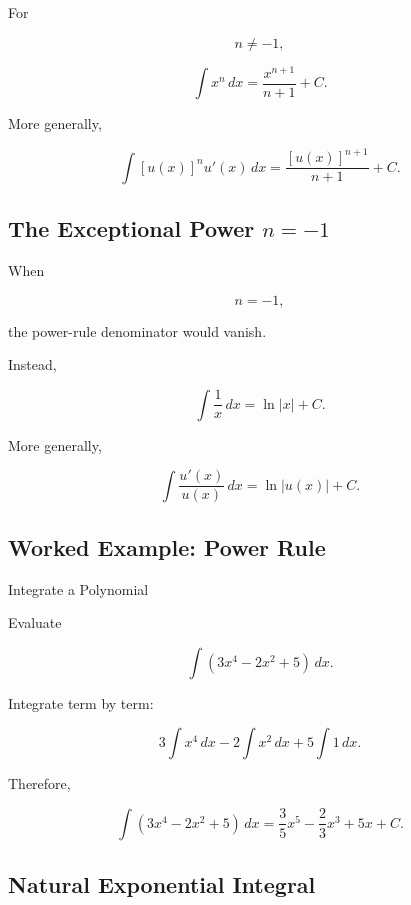 For

\[
n\neq-1,
\]

\[
\boxed{
\int x^n\,dx
=
\frac{x^{n+1}}{n+1}
+
C.
}
\]

More generally,

\[
\boxed{
\int
[u(x)]^n u'(x)\,dx
=
\frac{
[u(x)]^{n+1}
}{
n+1
}
+
C.
}
\]

\subsection{The Exceptional Power \(n=-1\)}
\label{subsec:inverse-power-integral}

When

\[
n=-1,
\]

the power-rule denominator would vanish.

Instead,

\[
\boxed{
\int\frac1x\,dx
=
\ln|x|+C.
}
\]

More generally,

\[
\boxed{
\int
\frac{
u'(x)
}{
u(x)
}
\,dx
=
\ln|u(x)|+C.
}
\]

\subsection{Worked Example: Power Rule}
\label{subsec:worked-power-integral}

\begin{workedexamplebox}{Integrate a Polynomial}

Evaluate

\[
\int
(3x^4-2x^2+5)
\,dx.
\]

Integrate term by term:

\[
3\int x^4\,dx
-
2\int x^2\,dx
+
5\int1\,dx.
\]

Therefore,

\begin{answerbox}
\[
\boxed{
\int
(3x^4-2x^2+5)
\,dx
=
\frac35x^5
-
\frac23x^3
+
5x
+
C.
}
\]
\end{answerbox}

\end{workedexamplebox}

\subsection{Natural Exponential Integral}
\label{subsec:natural-exponential-integral}


